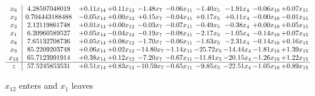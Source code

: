 \documentclass[9pt]{article}
\begin{document}
 \[\begin{array}{c| c c@{\hskip 2pt} c@{\hskip 2pt} c@{\hskip 2pt} c@{\hskip 2pt} c@{\hskip 2pt} c@{\hskip 2pt} c@{\hskip 2pt} c@{\hskip 2pt} }
 x_{6}   &  4.28597048019 & +  0.11 x_{14} & +  0.11 x_{12} & -1.48 x_{7} & -0.06 x_{11} & -1.40 x_{5} & -1.91 x_{4} & -0.06 x_{10} & +  0.07 x_{15}\\
 x_{2}   &  0.704443188488 & -0.05 x_{14} & +  0.00 x_{12} & +  0.15 x_{7} & -0.04 x_{11} & +  0.17 x_{5} & +  0.11 x_{4} & -0.00 x_{10} & -0.01 x_{15}\\
 x_{3}   &  2.12119861748 & +  0.01 x_{14} & +  0.00 x_{12} & -0.03 x_{7} & -0.07 x_{11} & -0.49 x_{5} & -0.38 x_{4} & +  0.00 x_{10} & +  0.05 x_{15}\\
 x_{1}   &  6.20960589527 & +  0.05 x_{14} & -0.04 x_{12} & -0.19 x_{7} & -0.08 x_{11} & -2.17 x_{5} & -1.05 x_{4} & -0.14 x_{10} & +  0.07 x_{15}\\
 x_{8}   &  7.65132708736 & +  0.05 x_{14} & +  0.08 x_{12} & -1.70 x_{7} & -0.06 x_{11} & -1.63 x_{5} & -2.31 x_{4} & -0.14 x_{10} & +  0.16 x_{15}\\
 x_{9}   &  85.2209203748 & +  0.06 x_{14} & +  0.02 x_{12} & -14.80 x_{7} & -1.14 x_{11} & -25.72 x_{5} & -14.44 x_{4} & -1.81 x_{10} & +  1.39 x_{15}\\
 x_{13}   &  65.7123991914 & +  0.38 x_{14} & +  0.12 x_{12} & -7.20 x_{7} & -0.67 x_{11} & -11.81 x_{5} & -20.15 x_{4} & -1.26 x_{10} & +  1.22 x_{15}\\
\hline
z    &  57.5245853531 & +  0.51 x_{14} & +  0.83 x_{12} & -10.59 x_{7} & -0.65 x_{11} & -9.85 x_{5} & -22.51 x_{4} & -1.05 x_{10} & +  0.89 x_{15}\\
\end{array}\]


 $ x_{12} $ enters and $ x_{1} $ leaves 
\end{document}
